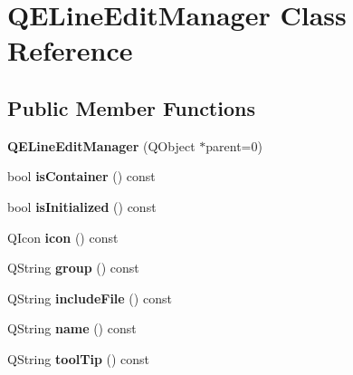 \hypertarget{classQELineEditManager}{
\section{QELineEditManager Class Reference}
\label{classQELineEditManager}
}
\subsection*{Public Member Functions}
\begin{DoxyCompactItemize}
\item 
\hypertarget{classQELineEditManager_ac2937a97b106c1d0bde807ea483c1e7b}{
{\bfseries QELineEditManager} (QObject $\ast$parent=0)}
\label{classQELineEditManager_ac2937a97b106c1d0bde807ea483c1e7b}

\item 
\hypertarget{classQELineEditManager_a88800a94c2a50e7eaddf094a95cdcd74}{
bool {\bfseries isContainer} () const }
\label{classQELineEditManager_a88800a94c2a50e7eaddf094a95cdcd74}

\item 
\hypertarget{classQELineEditManager_af3d561a4c1699b0f316e3bd9186b2c23}{
bool {\bfseries isInitialized} () const }
\label{classQELineEditManager_af3d561a4c1699b0f316e3bd9186b2c23}

\item 
\hypertarget{classQELineEditManager_a035ea23d189b619acad2ffaecc3e1707}{
QIcon {\bfseries icon} () const }
\label{classQELineEditManager_a035ea23d189b619acad2ffaecc3e1707}

\item 
\hypertarget{classQELineEditManager_a2ab97f4a4610db9872ba0540e9965c20}{
QString {\bfseries group} () const }
\label{classQELineEditManager_a2ab97f4a4610db9872ba0540e9965c20}

\item 
\hypertarget{classQELineEditManager_a9f0b77a90c174ca71e7b7e7703555f3d}{
QString {\bfseries includeFile} () const }
\label{classQELineEditManager_a9f0b77a90c174ca71e7b7e7703555f3d}

\item 
\hypertarget{classQELineEditManager_a9be2d2dc5dfb1e8b20c8fabbac63ae38}{
QString {\bfseries name} () const }
\label{classQELineEditManager_a9be2d2dc5dfb1e8b20c8fabbac63ae38}

\item 
\hypertarget{classQELineEditManager_a45ed3282f898baefddbab402bb51d541}{
QString {\bfseries toolTip} () const }
\label{classQELineEditManager_a45ed3282f898baefddbab402bb51d541}


\end{DoxyCompactItemize}
